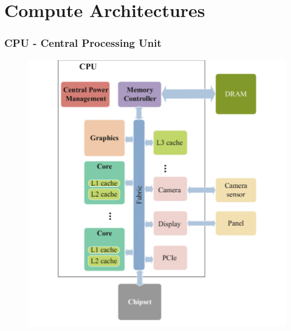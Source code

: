 \documentclass[xcolor=x11names,table]{beamer}
\begin{document}
	\section{Compute Architectures}
	\begin{frame}
		\frametitle{CPU - Central Processing Unit}
		\begin{figure}[p]
			\centering
			\includegraphics[width=\linewidth,height=\dimexpr\textheight-2\baselineskip-\abovecaptionskip-\belowcaptionskip\relax,keepaspectratio]{refs/High-level-architecture-of-modern-processors.png}
			\label{fig:cpu-architecture}
		\end{figure}
	
	\end{frame}
	
\end{document}
